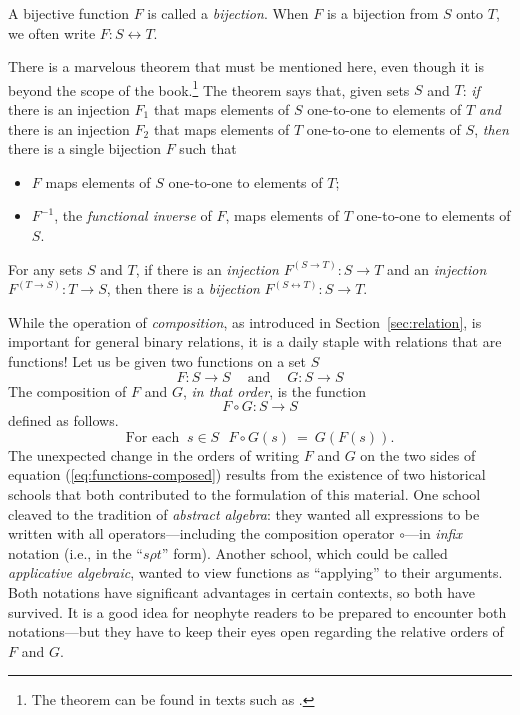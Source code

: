 \begin{enumerate}
A bijective function $F$ is called a {\it bijection}.  When $F$ is a
bijection from $S$ onto $T$, we often write $F: S \leftrightarrow T$.
\end{enumerate}
There is a marvelous theorem that must be mentioned here, even though
it is beyond the scope of the book.\footnote{The theorem can be found
  in texts such as \cite{Birkhoff-MacLane53}.}
%
The theorem says that, given sets $S$ and $T$: {\em if} there is an
injection $F_1$ that maps elements of $S$ one-to-one to elements of
$T$ {\em and} there is an injection $F_2$ that maps elements of $T$
one-to-one to elements of $S$, {\em then} there is a single bijection
$F$ such that
\begin{itemize}
\item
$F$ maps elements of $S$ one-to-one to elements of $T$;
\item
$F^{-1}$, the {\it functional inverse} of $F$,
maps elements of $T$ one-to-one to elements of $S$.
\end{itemize}

\begin{theorem}
For any sets $S$ and $T$, if there is an {\em injection} $F^{(S
  \rightarrow T)}: S \rightarrow T$ and an {\em injection} $F^{(T
  \rightarrow S)}: T \rightarrow S$, then there is a {\em bijection}
$F^{(S \leftrightarrow T)}: S \rightarrow T$.
\end{theorem}

\medskip

While the operation of {\it composition},
 
as introduced in Section~\ref{sec:relation}, is important for
general binary relations, it is a daily staple with relations that are
functions!  Let us be given two functions on a set $S$
\[
F: S \rightarrow S \ \ \ \ \mbox{ and } \ \ \ \ G: S \rightarrow S
\]
The composition of $F$ and $G$, {\em in that order}, is the function
\[ F \circ G: S \rightarrow S \]
defined as follows.
\begin{equation}
\label{eq:functions-composed}
\mbox{For each } \ s \in S \ \ \
F \circ G(s) \ = \ G(F(s)).
\end{equation}
The unexpected change in the orders of writing $F$ and $G$ on the two
sides of equation (\ref{eq:functions-composed}) results from the
existence of two historical schools that both contributed to the
formulation of this material.
One school cleaved to the tradition of {\it abstract algebra}:  they
wanted all expressions to be written with all operators---including
the composition operator $\circ$---in {\em infix} notation (i.e., in
the ``$s \rho t$'' form).  Another school, which could be called {\it
  applicative algebraic}, wanted to view functions as ``applying'' to
their arguments.  Both notations have significant advantages in
certain contexts, so both have survived.  It is a good idea for
neophyte readers to be prepared to encounter both notations---but they
have to keep their eyes open regarding the relative orders of $F$ and
$G$.

